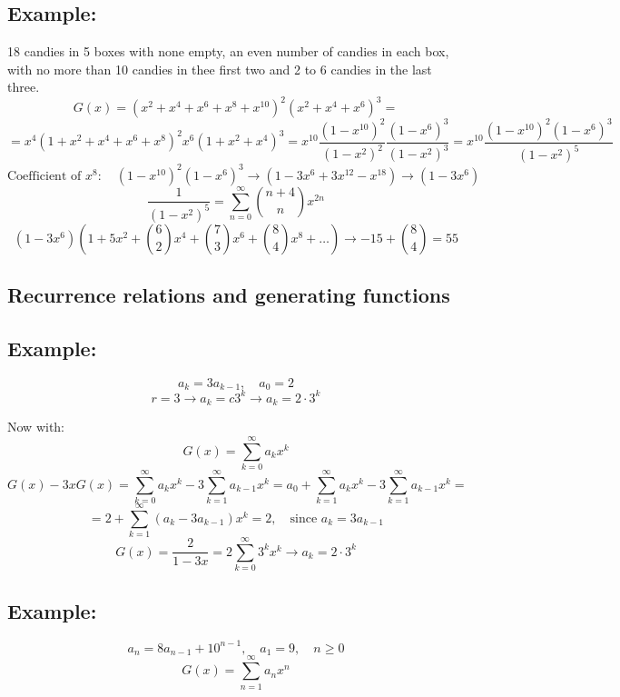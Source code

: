\documentclass[11pt]{article}
\begin{document}
\subsection*{Example:}
18 candies in 5 boxes with none empty, an even number of candies in each box, with no more than 10 candies in thee first two and 2 to 6 candies in the last three.
\[
G(x) = (x^2 + x^4 + x^6 + x^8 + x^{10})^2(x^2 + x^4 + x^6)^3 =
\]
\[
= x^4 (1 + x^2 + x^4 + x^6 + x^8)^2 x^6(1 + x^2 + x^4)^3 = x^{10} \frac{(1 - x^{10})^2}{(1 - x^2)^2} \frac{(1 - x^6)^3}{(1 - x^2)^3} = x^{10} \frac{(1 - x^{10})^2 (1 - x^6)^3}{(1 - x^2)^5}
\]
\[
\text{Coefficient of } x^{8}: \quad (1 - x^{10})^2 (1 - x^6)^3 \rightarrow (1 - 3x^6 + 3x^{12} - x^{18}) \rightarrow (1 - 3x^6)
\]
\[
\frac{1}{(1 - x^2)^5} = \sum_{n = 0}^{\infty} \binom{n + 4}{n} x^{2n}
\]
\[
(1 - 3x^6)\left(1 + 5x^2 + \binom{6}{2}x^4 + \binom{7}{3}x^6 + \binom{8}{4}x^8 + \dots\right) \rightarrow -15 + \binom{8}{4} = 55
\]

\subsection{Recurrence relations and generating functions}
\subsection*{Example:}
\[
a_k = 3a_{k-1}, \quad a_0 = 2
\]
\[
r = 3 \rightarrow a_k = c3^k \rightarrow a_k = 2 \cdot 3^k
\]

Now with:
\[
G(x) = \sum_{k = 0}^{\infty} a_k x^k 
\]
\[
G(x) - 3xG(x) = \sum_{k = 0}^{\infty} a_k x^k - 3 \sum_{k = 1}^{\infty} a_{k-1} x^k = a_0 + \sum_{k = 1}^{\infty} a_k x^k - 3 \sum_{k = 1}^{\infty} a_{k-1} x^k =
\]
\[
= 2 + \sum_{k = 1}^{\infty} (a_k - 3a_{k-1}) x^k = 2, \quad \text{since } a_k = 3a_{k-1}
\]
\[
G(x) = \frac{2}{1 - 3x} = 2 \sum_{k = 0}^{\infty} 3^k x^k \rightarrow a_k = 2 \cdot 3^k
\]

\subsection*{Example:}
\[
a_n = 8a_{n-1} + 10^{n-1}, \quad a_1 = 9, \quad n \geq 0
\]
\[
G(x) = \sum_{n = 1}^{\infty} a_n x^n
\]
\end{document}

